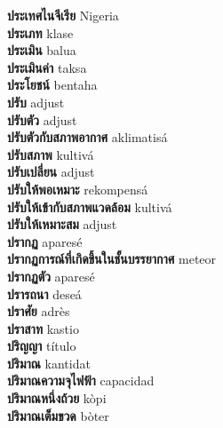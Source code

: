 \textbf{ ประเทศไนจีเรีย  } Nigeria \\
\textbf{ ประเภท  } klase \\
\textbf{ ประเมิน  } balua \\
\textbf{ ประเมินค่า  } taksa \\
\textbf{ ประโยชน์  } bentaha \\
\textbf{ ปรับ  } adjust \\
\textbf{ ปรับตัว  } adjust \\
\textbf{ ปรับตัวกับสภาพอากาศ  } aklimatisá \\
\textbf{ ปรับสภาพ  } kultivá \\
\textbf{ ปรับเปลี่ยน  } adjust \\
\textbf{ ปรับให้พอเหมาะ  } rekompensá \\
\textbf{ ปรับให้เข้ากับสภาพแวดล้อม  } kultivá \\
\textbf{ ปรับให้เหมาะสม  } adjust \\
\textbf{ ปรากฏ  } aparesé \\
\textbf{ ปรากฏการณ์ที่เกิดขึ้นในชั้นบรรยากาศ  } meteor \\
\textbf{ ปรากฏตัว  } aparesé \\
\textbf{ ปรารถนา  } deseá \\
\textbf{ ปราศัย  } adrès \\
\textbf{ ปราสาท  } kastio \\
\textbf{ ปริญญา  } título \\
\textbf{ ปริมาณ  } kantidat \\
\textbf{ ปริมาณความจุไฟฟ้า  } capacidad \\
\textbf{ ปริมาณหนึ่งถ้วย  } kòpi \\
\textbf{ ปริมาณเต็มขวด  } bòter \\
